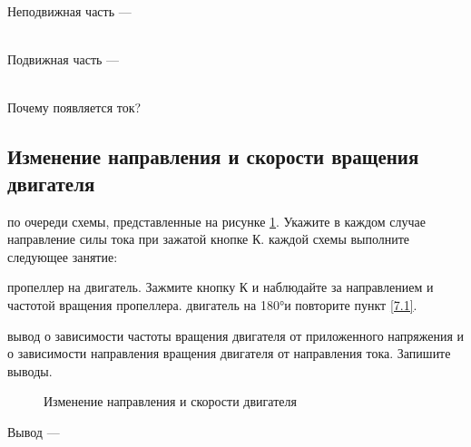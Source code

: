 Неподвижная часть --- \hrulefill 

\hrulefill

\hrulefill
\\
Подвижная часть --- \hrulefill 

\hrulefill

\hrulefill
\\
Почему появляется ток?

\hrulefill 

\hrulefill

\hrulefill

\subsection{Изменение направления и скорости вращения двигателя}

\begin{enumerate}
     по очереди схемы, представленные на рисунке \ref{fig:7.1}. Укажите в каждом случае направление силы тока при зажатой кнопке К.
     каждой схемы выполните следующее занятие:
    \begin{enumerate}
         пропеллер на двигатель. Зажмите кнопку К и наблюдайте за направлением и частотой вращения пропеллера.\label{7.1}
         двигатель на 180°и повторите пункт \ref{7.1}.
    \end{enumerate}
     вывод о зависимости частоты вращения двигателя от приложенного напряжения и о зависимости направления вращения двигателя от направления тока. Запишите выводы. 

\begin{figure}[h]
\begin{minipage}[h]{0.5\linewidth}
\end{minipage}
\hfill
\begin{minipage}[h]{0.5\linewidth}
\end{minipage}
\caption{Изменение направления и скорости двигателя}
\label{fig:7.1}
\end{figure}



Вывод --- \hrulefill

\hrulefill

\hrulefill

\end{enumerate}

